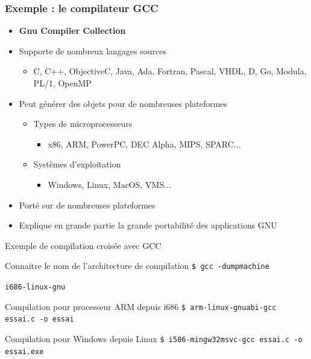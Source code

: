 \begin{frame}
\frametitle{Exemple : le compilateur GCC}
\begin{itemize}
\item \textbf{Gnu Compiler Collection}
\item Supporte de nombreux langages sources
\begin{itemize}
\item C, C++, ObjectiveC, Java, Ada, Fortran, Pascal, VHDL, D, Go, Modula, PL/1, OpenMP
\end{itemize}
\item Peut générer des objets pour de nombreuses plateformes
\begin{itemize}
\item Types de microprocesseurs
\begin{itemize}
\item x86, ARM, PowerPC, DEC Alpha, MIPS, SPARC...
\end{itemize}
\item Systèmes d'exploitation
\begin{itemize}
\item Windows, Linux, MacOS, VMS...
\end{itemize}
\end{itemize}
\item Porté sur de nombreuses plateformes
\item Explique en grande partie la grande portabilité des applications GNU
\end{itemize}
\end{frame}


\begin{frame}{Exemple de compilation croisée avec GCC}
\begin{exampleblock}{Connaitre le nom de l'architecture de compilation}
\texttt{\$ gcc -dumpmachine}

\texttt{i686-linux-gnu}
\end{exampleblock}

\begin{exampleblock}{Compilation pour processeur ARM depuis i686}
\texttt{\$ arm-linux-gnuabi-gcc essai.c -o essai}
\end{exampleblock}

\begin{exampleblock}{Compilation pour Windows depuis Linux}
\texttt{\$ i586-mingw32msvc-gcc essai.c -o essai.exe}
\end{exampleblock}
\end{frame}

